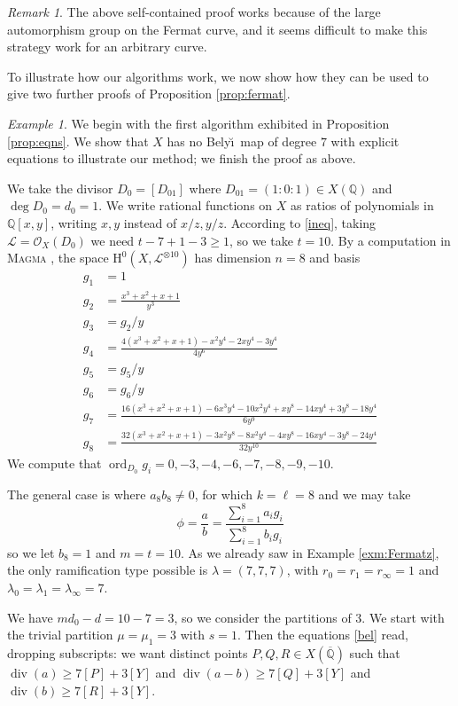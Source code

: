 \documentclass{amsproc}
\numberwithin{equation}{section}
\numberwithin{figure}{section}
\theoremstyle{definition}
\theoremstyle{remark}
\newtheorem{remark}[equation]{Remark}
\newtheorem{example}[equation]{Example}
\DeclareMathOperator{\ord}{ord}
\DeclareMathOperator{\opdiv}{div}
\newcommand{\Qbar}{\overline{\mathbb{Q}}}
\newcommand{\Q}{\QQ}
\newcommand{\scrL}{\mathscr{L}}
\newcommand\QQ{\mathbb{Q}}
\newcommand\scrO{\mathscr{O}}
\newcommand\Hzero{\mathrm{H}^0}
\renewcommand{\geq}{\geqslant}
\newcommand{\Belyi}{Bely\u{\i}}
\begin{document}
\begin{remark}
The above self-contained proof works because of the large automorphism group on the Fermat curve, and it seems difficult to make this strategy work for an arbitrary curve.  
\end{remark}

To illustrate how our algorithms work, we now show how they can be used to give two further proofs of Proposition \ref{prop:fermat}.

\begin{example}
We begin with the first algorithm exhibited in Proposition \ref{prop:eqns}.  We show that $X$ has no \Belyi\ map of degree $7$ with explicit equations to illustrate our method; we finish the proof as above.

We take the divisor $D_0=[D_{01}]$ where $D_{01}=(1:0:1)\in X(\Q)$ and $\deg D_0=d_0=1$.  We write rational functions on $X$ as ratios of polynomials in $\Q[x,y]$, writing $x,y$ instead of $x/z,y/z$.  According to \eqref{ineq}, taking $\scrL=\scrO_X(D_0)$ we need $t-7+1-3 \geq 1$, so we take $t=10$.  By a computation in \textsc{Magma} \cite{Magma}, the space $\Hzero(X,\scrL^{\otimes 10})$ has dimension $n=8$ and basis
\begin{equation}
\begin{aligned}
g_1 &= 1 \\
g_2 &= \frac{x^3+x^2+x+1}{y^3} \\
g_3 &= g_2/y \\
g_4 &= \frac{4(x^3+x^2+x+1) - x^2y^4 - 2xy^4 - 3y^4}{4y^6} \\
g_5 &= g_5/y \\
g_6 &= g_6/y \\
g_7 &= \frac{16(x^3+x^2+x+1)-6x^3y^4 - 10x^2y^4 + xy^8 - 14xy^4 + 3y^8 - 18y^4}{6y^9} \\
g_8 &= \frac{32(x^3+x^2+x+1) - 3x^2y^8 - 8x^2y^4 - 4xy^8 - 16xy^4 - 3y^8 - 24y^4}{32y^{10}}
\end{aligned}
\end{equation}
We compute that $\ord_{D_0} g_i = 0,-3,-4,-6,-7,-8,-9,-10$.

The general case is where $a_8b_8 \neq 0$, for which $k=\ell=8$ and we may take
\[ \phi=\frac{a}{b}=\frac{\sum_{i=1}^{8} a_i g_i}{\sum_{i=1}^{8} b_i g_i} \]
so we let $b_8=1$ and $m=t=10$.  As we already saw in Example \ref{exm:Fermatz}, the only ramification type possible is $\lambda=(7,7,7)$, with $r_0=r_1=r_\infty=1$ and $\lambda_0=\lambda_1=\lambda_\infty=7$.  

We have $md_0-d=10-7=3$, so we consider the partitions of $3$.  We start with the trivial partition $\mu=\mu_1=3$ with $s=1$.  Then the equations \eqref{bel} read, dropping subscripts: we want distinct points $P,Q,R \in X(\Qbar)$ such that $\opdiv(a) \geq 7[P]+3[Y]$ and $\opdiv(a-b) \geq 7[Q]+3[Y]$ and $\opdiv(b) \geq 7[R]+3[Y]$.  


\end{example}
\end{document}
